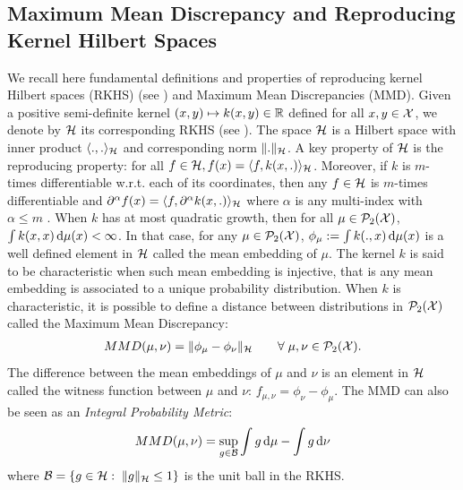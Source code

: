\subsection{Maximum Mean Discrepancy and Reproducing Kernel Hilbert Spaces}\label{sec:rkhs}
We recall here fundamental definitions and properties of reproducing kernel Hilbert spaces (RKHS) (see \cite{smola1998learning}) and Maximum Mean Discrepancies (MMD). 
Given a positive semi-definite kernel $(x,y)\mapsto k(x,y)\in {{\mathbb R}}$ defined for all $x,y\in{{\mathcal X}}$, we denote by ${{\mathcal H}}$ its corresponding RKHS (see \cite{smola1998learning}). The space ${{\mathcal H}}$ is a Hilbert space with inner product $\langle .,. \rangle_{{{\mathcal H}}}$ and corresponding norm $\Vert . \Vert_{{{\mathcal H}}}$. A key property of ${{\mathcal H}}$ is the reproducing property: for all $f \in {{\mathcal H}}, f(x) = \langle f, k(x, .)\rangle_{{{\mathcal H}}}$. Moreover, if $k$ is $m$-times differentiable w.r.t. each of its coordinates, then any $f\in {{\mathcal H}}$  is $m$-times differentiable  and $\partial^{\alpha}f(x)=\langle f, \partial^{\alpha} k(x,.) \rangle_{{{\mathcal H}}}$ where $\alpha$ is any multi-index with $\alpha \leq m$ \cite[Lemma 4.34]{Steinwart:2008a}. When $k$ has at most quadratic growth, then for all $\mu\in \mathcal{P}_2({{\mathcal X}})$, $\int k(x,x) \mathop{}\!\mathrm{d} \mu(x) <\infty$. In that case, for any $\mu\in \mathcal{P}_2({{\mathcal X}})$,  $ \phi_{\mu} := \int k(.,x)\mathop{}\!\mathrm{d} \mu(x)$ is a well defined element in ${{\mathcal H}}$ called the mean embedding of $\mu$. The kernel $k$ is said to be characteristic when such mean embedding is injective, that is any mean embedding is associated to a unique probability distribution. When $k$ is characteristic, it is possible to define a distance between distributions in $\mathcal{P}_2({{\mathcal X}})$ called the Maximum Mean Discrepancy:
\begin{align}
	MMD(\mu,\nu) = \Vert \phi_{\mu} - \phi_{\nu}\Vert_{{{\mathcal H}}} \qquad \forall \; \mu,\nu \in \mathcal{P}_2({{\mathcal X}}).
\end{align}
The difference between the mean embeddings of $\mu$ and $\nu$ is an element in ${{\mathcal H}}$ called the witness function between $\mu$ and $\nu$:  $f_{\mu,\nu} = \phi_{\nu} - \phi_{\mu}$. The MMD can also be seen as an \textit{Integral Probability Metric}:
\begin{align}
MMD(\mu,\nu) = \sup_{g\in \mathcal{B}} \int g\mathop{}\!\mathrm{d}\mu - \int g \mathop{}\!\mathrm{d}\nu
\end{align}
where $\mathcal{B} = \{ g\in {{\mathcal H}} : \; \Vert g\Vert_{{{\mathcal H}}}\leq 1 \}$  is the unit ball in the RKHS.

